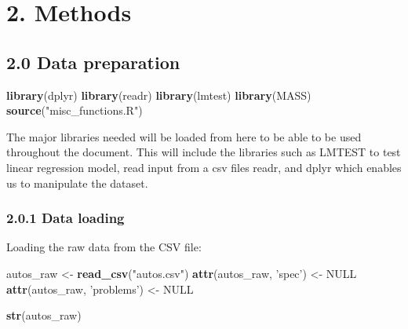 \documentclass[]{article}
\newenvironment{Shaded}{\begin{snugshade}}{\end{snugshade}}
\newcommand{\KeywordTok}[1]{\textcolor[rgb]{0.13,0.29,0.53}{\textbf{#1}}}
\newcommand{\NormalTok}[1]{#1}
\newcommand{\OtherTok}[1]{\textcolor[rgb]{0.56,0.35,0.01}{#1}}
\newcommand{\StringTok}[1]{\textcolor[rgb]{0.31,0.60,0.02}{#1}}
\begin{document}
\hypertarget{methods}{%
\section{2. Methods}\label{methods}}

\hypertarget{data-preparation}{%
\subsection{2.0 Data preparation}\label{data-preparation}}

\begin{Shaded}
\begin{Highlighting}[]
\KeywordTok{library}\NormalTok{(dplyr)}
\KeywordTok{library}\NormalTok{(readr)}
\KeywordTok{library}\NormalTok{(lmtest)}
\KeywordTok{library}\NormalTok{(MASS)}
\KeywordTok{source}\NormalTok{(}\StringTok{"misc_functions.R"}\NormalTok{)}
\end{Highlighting}
\end{Shaded}

The major libraries needed will be loaded from here to be able to be
used throughout the document. This will include the libraries such as
LMTEST to test linear regression model, read input from a csv files
readr, and dplyr which enables us to manipulate the dataset.

\hypertarget{data-loading}{%
\subsubsection{2.0.1 Data loading}\label{data-loading}}

Loading the raw data from the CSV file:

\begin{Shaded}
\begin{Highlighting}[]
\NormalTok{autos_raw <-}\StringTok{ }\KeywordTok{read_csv}\NormalTok{(}\StringTok{"autos.csv"}\NormalTok{)}
\KeywordTok{attr}\NormalTok{(autos_raw, }\StringTok{'spec'}\NormalTok{) <-}\StringTok{ }\OtherTok{NULL}
\KeywordTok{attr}\NormalTok{(autos_raw, }\StringTok{'problems'}\NormalTok{) <-}\StringTok{ }\OtherTok{NULL}

\KeywordTok{str}\NormalTok{(autos_raw)}
\end{Highlighting}
\end{Shaded}
\end{document}
